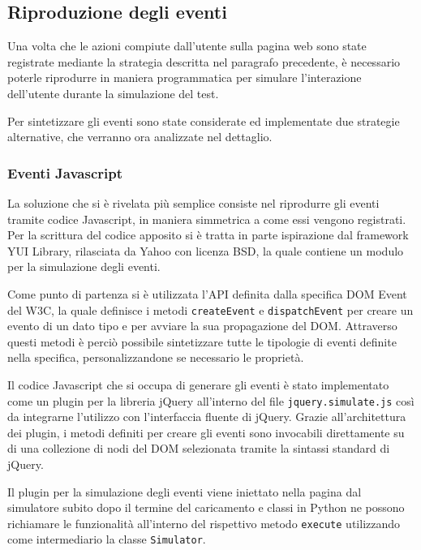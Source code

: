 \documentclass[12pt]{toptesi}
\begin{document}

\subsection{Riproduzione degli eventi}

Una volta che le azioni compiute dall'utente sulla pagina web sono state registrate mediante la strategia descritta nel paragrafo precedente, è necessario poterle riprodurre in maniera programmatica per simulare l'interazione dell'utente durante la simulazione del test.

Per sintetizzare gli eventi sono state considerate ed implementate due strategie alternative, che verranno ora analizzate nel dettaglio.

\subsubsection{Eventi Javascript}

La soluzione che si è rivelata più semplice consiste nel riprodurre gli eventi tramite codice Javascript, in maniera simmetrica a come essi vengono registrati. Per la scrittura del codice apposito si è tratta in parte ispirazione dal framework YUI Library, rilasciata da Yahoo con licenza BSD, la quale contiene un modulo per la simulazione degli eventi. 

Come punto di partenza si è utilizzata l'API definita dalla specifica DOM Event del W3C, la quale definisce i metodi \verb|createEvent| e \verb|dispatchEvent| per creare un evento di un dato tipo e per avviare la sua propagazione del DOM. Attraverso questi metodi è perciò possibile sintetizzare tutte le tipologie di eventi definite nella specifica, personalizzandone se necessario le proprietà.

Il codice Javascript che si occupa di generare gli eventi è stato implementato come un plugin per la libreria jQuery all'interno del file \verb|jquery.simulate.js| così da integrarne l'utilizzo con l'interfaccia fluente di jQuery. Grazie all'architettura dei plugin, i metodi definiti per creare gli eventi sono invocabili direttamente su di una collezione di nodi del DOM selezionata tramite la sintassi standard di jQuery.



Il plugin per la simulazione degli eventi viene iniettato nella pagina dal simulatore subito dopo il termine del caricamento e classi in Python ne possono richiamare le funzionalità all'interno del rispettivo metodo \verb|execute| utilizzando come intermediario la classe \verb|Simulator|. 
\end{document}
